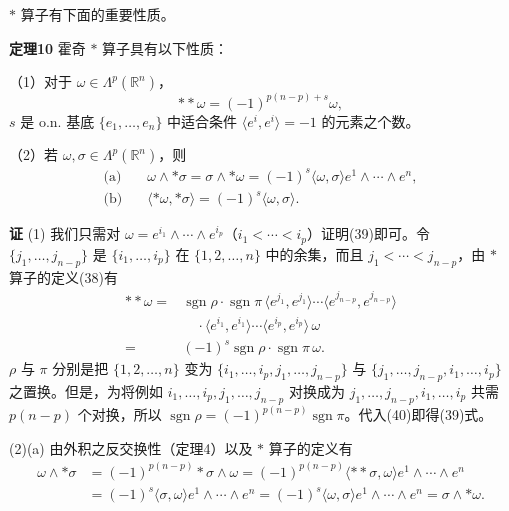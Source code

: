 $*$ 算子有下面的重要性质。

\noindent\textbf{定理10}
霍奇 $*$ 算子具有以下性质：

（1）对于 $\omega\in\Lambda^p(\mathbb R^n)$，
\begin{equation}
 **\omega=(-1)^{p(n-p)+s}\omega,
 \tag{39}
\end{equation}
$s$ 是 o.n. 基底 $\{e_1,\ldots,e_n\}$ 中适合条件 $\langle e^i,e^i\rangle=-1$ 的元素之个数。

（2）若 $\omega,\sigma\in\Lambda^p(\mathbb R^n)$，则
\begin{align*}
 \text{(a)}\quad &\omega\wedge*\sigma=\sigma\wedge*\omega=(-1)^s\langle\omega,\sigma\rangle e^1\wedge\cdots\wedge e^n,\\
 \text{(b)}\quad &\langle*\omega,*\sigma\rangle=(-1)^s\langle\omega,\sigma\rangle.
\end{align*}

\noindent\textbf{证}
(1) 我们只需对 $\omega=e^{i_1}\wedge\cdots\wedge e^{i_p}$（$i_1<\cdots<i_p$）证明(39)即可。令 $\{j_1,\ldots,j_{n-p}\}$ 是 $\{i_1,\ldots,i_p\}$ 在 $\{1,2,\ldots,n\}$ 中的余集，而且 $j_1<\cdots<j_{n-p}$，由 $*$ 算子的定义(38)有
\begin{equation}
\begin{aligned}
 **\omega={}&\operatorname{sgn}\rho\cdot\operatorname{sgn}\pi\,
 \langle e^{j_1},e^{j_1}\rangle\cdots\langle e^{j_{n-p}},e^{j_{n-p}}\rangle\\
 &\quad\cdot\langle e^{i_1},e^{i_1}\rangle\cdots\langle e^{i_p},e^{i_p}\rangle\,\omega\\
 ={}&(-1)^s\operatorname{sgn}\rho\cdot\operatorname{sgn}\pi\,\omega.
\end{aligned}
 \tag{40}
\end{equation}
$\rho$ 与 $\pi$ 分别是把 $\{1,2,\ldots,n\}$ 变为 $\{i_1,\ldots,i_p,j_1,\ldots,j_{n-p}\}$ 与 $\{j_1,\ldots,j_{n-p},i_1,\ldots,i_p\}$ 之置换。但是，为将例如 $i_1,\ldots,i_p,j_1,\ldots,j_{n-p}$ 对换成为 $j_1,\ldots,j_{n-p},i_1,\ldots,i_p$ 共需 $p(n-p)$ 个对换，所以 $\operatorname{sgn}\rho=(-1)^{p(n-p)}\operatorname{sgn}\pi$。代入(40)即得(39)式。

(2)(a) 由外积之反交换性（定理4）以及 $*$ 算子的定义有
\begin{align*}
 \omega\wedge*\sigma
 &=(-1)^{p(n-p)}*\sigma\wedge\omega
 =(-1)^{p(n-p)}\langle**\sigma,\omega\rangle e^1\wedge\cdots\wedge e^n\\
 &=(-1)^s\langle\sigma,\omega\rangle e^1\wedge\cdots\wedge e^n
 =(-1)^s\langle\omega,\sigma\rangle e^1\wedge\cdots\wedge e^n
 =\sigma\wedge*\omega.
\end{align*}

